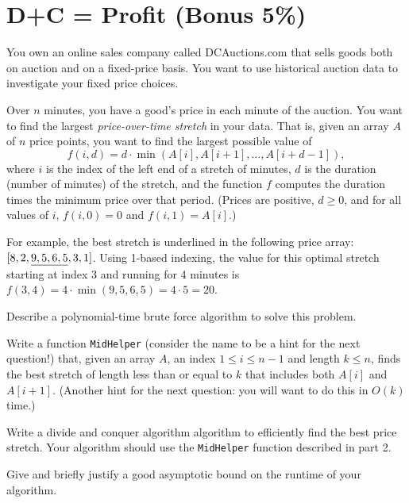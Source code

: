 \documentclass[11pt,fleqn]{exam}
\newif\ifsolutions\solutionsfalse
\begin{document}
\clearpage

\section{D+C = Profit (Bonus 5\%)}
You own an online sales company called DCAuctions.com that sells goods both on auction and on a fixed-price basis. You want to use historical auction data to investigate your fixed price choices.
	
	Over $n$ minutes, you have a good's price in each minute of the auction. You want to find the largest \textit{price-over-time stretch} in your data. That is, given an array $A$ of $n$ price points, you want to find the largest possible value of
	$$
	f(i,d) = d \cdot \min(A[i], A[i+1], \ldots, A[i+d-1]),
	$$
	where $i$ is the index of the left end of a stretch of minutes, $d$ is the duration (number of minutes) of the stretch, and the function $f$ computes the duration times the minimum price over that period. (Prices are positive, $d \ge 0$, and for all values of $i$, $f(i,0) = 0$ and $f(i,1) = A[i]$.)
	
	For example, the best stretch is underlined in the following price array: $[8, 2, \uline{9, 5, 6, 5}, 3, 1]$. Using 1-based indexing, the value for this optimal stretch starting at index 3 and running for 4 minutes is $f(3,4) = 4 \cdot \min(9,5,6,5) = 4 \cdot 5 = 20$.

 \begin{questions}
    \question[3] Describe a polynomial-time brute force algorithm to solve this problem.

    \ifsolutions\fi 

    \question[3] Write a function \texttt{MidHelper} (consider the name to be a hint for the next question!) that, given an array $A$, an index $1 \le i \le n-1$ and length $k \le n$, finds the best stretch of length less than or equal to $k$ that includes both $A[i]$ and $A[i+1]$. (Another hint for the next question: you will want to do this in $O(k)$ time.)

    \ifsolutions\fi

     \question[5] Write a divide and conquer algorithm algorithm to efficiently find the best price stretch. Your algorithm should use the \texttt{MidHelper} function described in part 2.

     \ifsolutions\fi 

     \question[2] Give and briefly justify a good asymptotic bound on the runtime of your algorithm.

     \ifsolutions\fi 
     
 \end{questions}
\end{document}
